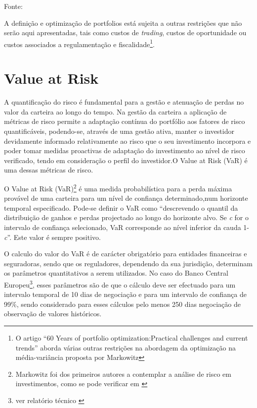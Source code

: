 \documentclass[
  12pt,
  a4paper,
  openany]{book}
\begin{document}
Fonte: \citep[p.33]{invest}

\justifying
\medskip

A definição e optimização de portfolios está sujeita a outras restrições que não serão aqui apresentadas, tais como custos de \emph{trading}, custos de oportunidade ou custos associados a regulamentação e fiscalidade\footnote{O artigo \citet{Fabozzi2014} ``60 Years of portfolio optimization:Practical challenges and current trends'' aborda várias outras restrições na abordagem da optimização na média-variância proposta por Markowitz}.

\hypertarget{value-at-risk}{%
\section{Value at Risk}\label{value-at-risk}}

A quantificação do risco é fundamental para a gestão e atenuação de perdas no valor da carteira ao longo do tempo. Na gestão da carteira a aplicação de métricas de risco permite a adaptação contínua do portfólio aos fatores de risco quantificáveis, podendo-se, através de uma gestão ativa, manter o investidor devidamente informado relativamente ao risco que o seu investimento incorpora e poder tomar medidas proactivas de adaptação do investimento ao nível de risco verificado, tendo em consideração o perfil do investidor.O Value at Risk (VaR) é uma dessas métricas de risco.

O Value at Risk (VaR)\footnote{Markowitz foi dos primeiros autores a contemplar a análise de risco em investimentos, como se pode verificar em \citet{Markowitz1952}} é uma medida probabilística para a perda máxima provável de uma carteira para um nível de confiança determinado,num horizonte temporal especificado. Pode-se definir o VaR como ``descrevendo o quantil da distribuição de ganhos e perdas projectado ao longo do horizonte alvo. Se \emph{c} for o intervalo de confiança selecionado, VaR corresponde ao nível inferior da cauda 1-\emph{c}''\citep[pp.17]{philippe}. Este valor é sempre positivo.

O calculo do valor do VaR é de carácter obrigatório para entidades financeiras e seguradoras, sendo que os reguladores, dependendo da sua jurisdição, determinam os parâmetros quantitativos a serem utilizados.
No caso do Banco Central Europeu\footnote{ver relatório técnico \citet{ecb}}, esses parâmetros são de que o cálculo deve ser efectuado para um intervalo temporal de 10 dias de negociação e para um intervalo de confiança de 99\%, sendo considerado para esses cálculos pelo menos 250 dias negociação de observação de valores históricos.
\end{document}

